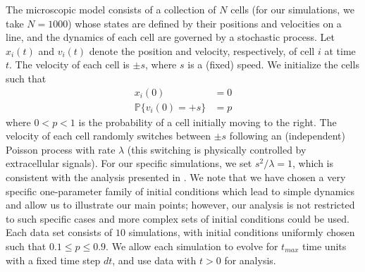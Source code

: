 \documentclass[3p]{elsarticle}
\begin{document}
The microscopic model consists of a collection of $N$ cells (for our simulations, we take $N=1000$) whose states are 
defined by their positions and velocities on a line, and the dynamics of each cell are governed by a stochastic process.
%
Let $x_i(t)$ and $v_i(t)$ denote the position and velocity, respectively, of cell $i$ at time $t$.
%
The velocity of each cell is $\pm s$, where $s$ is a (fixed) speed.
%
We initialize the cells such that
\begin{equation}\label{eqn:system}
\begin{aligned}
x_i(0) & = 0 \\
\mathbb{P} \{ v_i(0) = +s \} & = p
\end{aligned}
\end{equation}
where $0 < p < 1$ is the probability of a cell initially moving to the right.
%
The velocity of each cell randomly switches between $\pm s$ following an (independent) Poisson process with rate $\lambda$ (this switching is physically controlled by extracellular signals).
%
For our specific simulations, we set $s^2/\lambda=1$, which is consistent with the analysis presented in \cite{othmer1988models}.
%
We note that we have chosen a very specific one-parameter family of initial conditions which lead to simple dynamics and allow us to illustrate our main points;
however, our analysis is not restricted to such specific cases and more complex sets of initial conditions could be used.
%
Each data set consists of $10$ simulations, with initial conditions uniformly chosen such that $0.1 \le p  \le 0.9$.
%
We allow each simulation to evolve for $t_{max}$ time units with a fixed time step $dt$, and use data with $t > 0$ for analysis.
\end{document}
